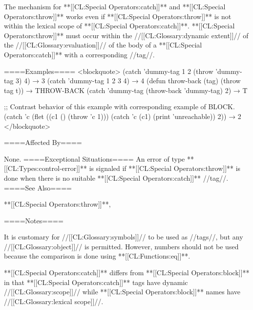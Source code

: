 The mechanism for **[[CL:Special Operators:catch]]** and **[[CL:Special Operators:throw]]** works even if **[[CL:Special Operators:throw]]** is not within the lexical scope of **[[CL:Special Operators:catch]]**. **[[CL:Special Operators:throw]]** must occur within the //[[CL:Glossary:dynamic extent]]// of the //[[CL:Glossary:evaluation]]// of the body of a **[[CL:Special Operators:catch]]** with a corresponding //tag//.

====Examples==== <blockquote> (catch 'dummy-tag 1 2 (throw 'dummy-tag 3) 4) → 3 (catch 'dummy-tag 1 2 3 4) → 4 (defun throw-back (tag) (throw tag t)) → THROW-BACK (catch 'dummy-tag (throw-back 'dummy-tag) 2) → T

;; Contrast behavior of this example with corresponding example of BLOCK. (catch 'c (flet ((c1 () (throw 'c 1))) (catch 'c (c1) (print 'unreachable)) 2)) → 2 </blockquote>

====Affected By====

None. ====Exceptional Situations==== An error of type **[[CL:Types:control-error]]** is signaled if **[[CL:Special Operators:throw]]** is done when there is no suitable **[[CL:Special Operators:catch]]** //tag//. ====See Also====

**[[CL:Special Operators:throw]]**, {\secref\Evaluation}

====Notes====

It is customary for //[[CL:Glossary:symbols]]// to be used as //tags//, but any //[[CL:Glossary:object]]// is permitted. However, numbers should not be used because the comparison is done using **[[CL:Functions:eq]]**.

**[[CL:Special Operators:catch]]** differs from **[[CL:Special Operators:block]]** in that **[[CL:Special Operators:catch]]** tags have dynamic //[[CL:Glossary:scope]]// while **[[CL:Special Operators:block]]** names have //[[CL:Glossary:lexical scope]]//.


